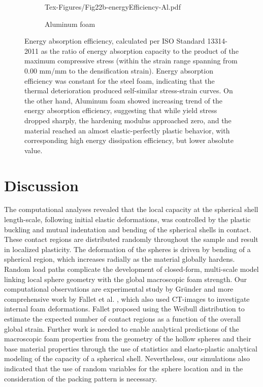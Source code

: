 \documentclass[review]{elsarticle}
\begin{document}
{\begin{figure}
\begin{subfigure}{0.50\textwidth}
		{Tex-Figures/Fig22b-energyEfficiency-Al.pdf}
		\caption{Aluminum foam}
		\label{fig:energyEfficiency_Al}
	\end{subfigure}
	\caption{ Energy absorption efficiency, calculated per ISO Standard 13314-2011 as the ratio of energy absorption capacity to the product of the maximum compressive stress (within the strain range spanning from 0.00 mm/mm to the densification strain). Energy absorption efficiency was constant for the steel foam, indicating that the thermal deterioration produced self-similar stress-strain curves. On the other hand, Aluminum foam showed increasing trend of the energy absorption efficiency, suggesting that while yield stress dropped sharply, the hardening modulus approached zero, and the material reached an almost elastic-perfectly plastic behavior, with corresponding high energy dissipation efficiency,  but lower absolute value.}
	\label{fig:energyEfficiency}
\end{figure}


\section{Discussion}

The computational analyses revealed that the local capacity at the spherical shell length-scale, following initial elastic deformations, was controlled by the plastic buckling and mutual indentation and bending of the spherical shells in contact. These contact regions are distributed randomly throughout the sample and result in localized plasticity. The deformation of the spheres is driven by bending of a spherical region, which increases radially as the material globally hardens. Random load paths complicate the development of closed-form, multi-scale model linking local sphere geometry with the global macroscopic foam strength. Our computational observations are experimental study by Gründer \cite{grunder_modeling_2001} and more comprehensive work by Fallet et al. \cite{Fallet2008}, which also used CT-images to investigate internal foam deformations. Fallet proposed using the Weibull distribution to estimate the expected number of contact regions as a function of the overall global strain. Further work is needed to enable analytical predictions of the macroscopic foam properties from the geometry of the hollow spheres and their base material properties through the use of statistics and elasto-plastic analytical modeling of the capacity of a spherical shell. Nevertheless, our simulations also indicated that the use of random variables for the sphere location and in the consideration of the packing pattern is necessary.

}
\end{document}
